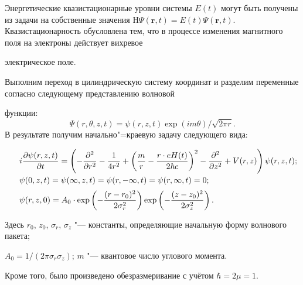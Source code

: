 Энергетические квазистационарные уровни системы $E(t)$ могут быть получены из задачи на собственные значения $\mathrm{H}\Psi(\boldsymbol{r},t)=

E(t)\Psi(\boldsymbol{r},t)$. Квазистационарность обусловлена тем, что в процессе изменения магнитного поля на электроны действует вихревое

электрическое поле.



\smallskip



 Выполним переход в цилиндрическую систему координат и разделим переменные согласно следующему представлению волновой

функции: $$\Psi(r,\theta,z,t)=\psi(r,z,t)\exp(im\theta)/\sqrt{2\pi r}.$$ В результате получим начально"=краевую задачу следующего вида:

\begin{equation}

\label{system}     \hspace{-4mm}

    \begin{array}{@{\,}r@{\quad}l@{}}

    &i\dfrac{\partial\psi(r,z,t)}{\partial{t}}=\left(-\dfrac{\partial^2}{\partial{r^2}}-\dfrac{1}{4r^2}+\left(\dfrac{m}{r}-\dfrac{r\cdot eH(t)}{2\hbar c}\right)^2-\dfrac{\partial^2}{\partial z^2}+V(r,z)\right)\psi(r,z,t); \vspace{1mm} \\

    &\psi(0,z,t)=\psi(\infty,z,t)=\psi(r,-\infty,t)=\psi(r,\infty,t)=0;\vspace{2mm}\\

    &\psi(r,z,0) = A_0\cdot \exp\left(-\dfrac{(r-r_0)^2}{2\sigma_r^2}\right)\exp\left(-\dfrac{(z-z_0)^2}{2\sigma_z^2}\right) .

    \end{array} \hspace{-5mm}

\end{equation}

Здесь $r_0$, $z_0$, $\sigma_r$, $\sigma_z$ "--- константы, определяющие начальную форму волнового пакета; 

$A_0=1/(2\pi \sigma_r \sigma_z)$; $m$ "--- квантовое число углового момента. 

Кроме того, было произведено обезразмеривание с учётом $\hbar=2\mu=1$.

